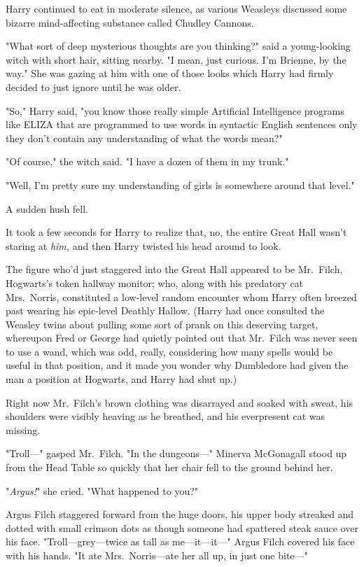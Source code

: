 Harry continued to eat in moderate silence, as various Weasleys discussed some 
bizarre mind-affecting substance called Chudley Cannons.

"What sort of deep mysterious thoughts are you thinking?" said a young-looking 
witch with short hair, sitting nearby. "I mean, just curious. I'm Brienne, by 
the way." She was gazing at him with one of those looks which Harry had firmly 
decided to just ignore until he was older.

"So," Harry said, "you know those really simple Artificial Intelligence 
programs like ELIZA that are programmed to use words in syntactic English 
sentences only they don't contain any understanding of what the words mean?"

"Of course," the witch said. "I have a dozen of them in my trunk."

"Well, I'm pretty sure my understanding of girls is somewhere around that 
level."

A sudden hush fell.

It took a few seconds for Harry to realize that, no, the entire Great Hall 
wasn't staring at \emph{him,} and then Harry twisted his head around to look.

The figure who'd just staggered into the Great Hall appeared to be Mr.~Filch, 
Hogwarts's token hallway monitor; who, along with his predatory cat 
Mrs.~Norris, constituted a low-level random encounter whom Harry often breezed 
past wearing his epic-level Deathly Hallow. (Harry had once consulted the 
Weasley twins about pulling some sort of prank on this deserving target, 
whereupon Fred or George had quietly pointed out that Mr.~Filch was never seen 
to use a wand, which was odd, really, considering how many spells would be 
useful in that position, and it made you wonder why Dumbledore had given the 
man a position at Hogwarts, and Harry had shut up.)

Right now Mr.~Filch's brown clothing was disarrayed and soaked with sweat, his 
shoulders were visibly heaving as he breathed, and his everpresent cat was 
missing.

"Troll---" gasped Mr.~Filch. "In the dungeons---"
\sbreak
Minerva McGonagall stood up from the Head Table so quickly that her chair fell 
to the ground behind her.

"\emph{Argus!}" she cried. "What happened to you?"

Argus Filch staggered forward from the huge doors, his upper body streaked and 
dotted with small crimson dots as though someone had spattered steak sauce over 
his face. "Troll---grey---twice as tall as me---it---it---" Argus Filch covered 
his face with his hands. "It ate Mrs.~Norris---ate her all up, in just one 
bite---"

